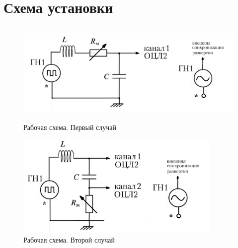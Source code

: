 \documentclass[14pt]{extarticle}
\begin{document}
    \section{Схема установки}
    \begin{figure}[h!]
        \centering
        \includegraphics[height=5cm]{img/scheme1.png}
        \caption{Рабочая схема. Первый случай}
    \end{figure}
    \begin{figure}[h!]
        \centering
        \includegraphics[height=5cm]{img/scheme2.png}
        \caption{Рабочая схема. Второй случай}
    \end{figure}

    \newpage
\end{document}

